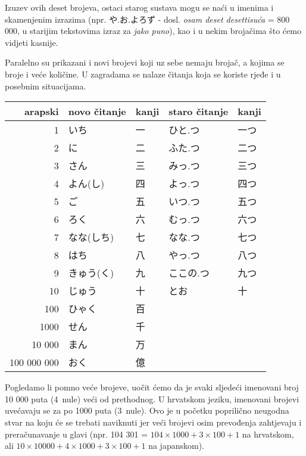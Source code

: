	Izuzev ovih deset brojeva, ostaci starog sustava mogu se naći u imenima i skamenjenim izrazima (npr. や.お.よろず - dosl. \textit{osam deset desettisuća} = 800 000, u starijim tekstovima izraz za \textit{jako puno}), kao i u nekim brojačima što ćemo vidjeti kasnije.
	
	Paralelno su prikazani i novi brojevi koji uz sebe nemaju brojač, a kojima se broje i veće količine. U zagradama se nalaze čitanja koja se koriste rjeđe i u posebnim situacijama.
	
	\vspace{5pt}
	\begin{table}[h]
		\centering
		\begin{tabular}{r l l l l}\toprule[2pt]
			arapski & novo čitanje & kanji & staro čitanje & kanji\\
			\midrule
			1			& いち & 一 & ひと.つ & 一つ \\
			2			& に & 二 & ふた.つ & 二つ \\
			3			& さん & 三 & みっ.つ & 三つ \\
			4			& よん(し) & 四 & よっ.つ & 四つ \\
			5			& ご & 五 & いつ.つ & 五つ \\
			6			& ろく & 六 & むっ.つ & 六つ \\
			7			& なな(しち) & 七 & なな.つ & 七つ \\
			8			& はち & 八 & やっ.つ & 八つ \\
			9			& きゅう(く) & 九 & ここの.つ & 九つ \\
			10			& じゅう & 十 & とお & 十 \\
			100			& ひゃく & 百 &  &  \\
			1000		& せん & 千 &  &  \\
			10 000		& まん & 万 &  &  \\
			100 000 000	& おく & 億 &  &  \\
			\bottomrule
		\end{tabular}
	\end{table}

	\vspace{5pt}
	Pogledamo li pomno veće brojeve, uočit ćemo da je svaki sljedeći imenovani broj 10 000 puta (4~nule) veći od prethodnog. U hrvatskom jeziku, imenovani brojevi uvećavaju se za po 1000 puta (3~nule). Ovo je u početku poprilično neugodna stvar na koju će se trebati naviknuti jer veći brojevi osim prevođenja zahtjevaju i preračunavanje u glavi (npr. 104 301 = $104\times 1000 + 3\times 100 + 1$ na hrvatskom, ali $10\times 10 000 + 4\times 1000 + 3\times 100 + 1$ na japanskom).


